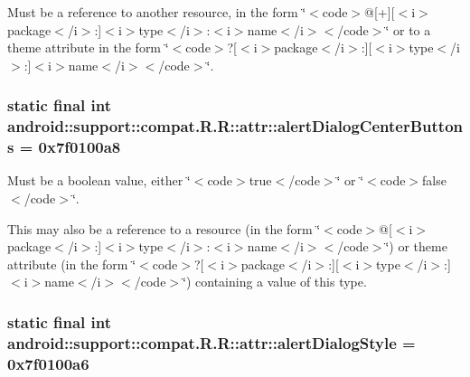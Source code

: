 Must be a reference to another resource, in the form \char`\"{}$<$code$>$@\mbox{[}+\mbox{]}\mbox{[}$<$i$>$package$<$/i$>$:\mbox{]}$<$i$>$type$<$/i$>$:$<$i$>$name$<$/i$>$$<$/code$>$\char`\"{} or to a theme attribute in the form \char`\"{}$<$code$>$?\mbox{[}$<$i$>$package$<$/i$>$:\mbox{]}\mbox{[}$<$i$>$type$<$/i$>$:\mbox{]}$<$i$>$name$<$/i$>$$<$/code$>$\char`\"{}. \hypertarget{classandroid_1_1support_1_1compat_1_1_r_1_1attr_4100dbaeb2699eb6a05f4d338dc8fa5c}{
\subsubsection[{alertDialogCenterButtons}]{\setlength{\rightskip}{0pt plus 5cm}static final int android::support::compat.R.R::attr::alertDialogCenterButtons = 0x7f0100a8}}
\label{classandroid_1_1support_1_1compat_1_1_r_1_1attr_4100dbaeb2699eb6a05f4d338dc8fa5c}


Must be a boolean value, either \char`\"{}$<$code$>$true$<$/code$>$\char`\"{} or \char`\"{}$<$code$>$false$<$/code$>$\char`\"{}. 

This may also be a reference to a resource (in the form \char`\"{}$<$code$>$@\mbox{[}$<$i$>$package$<$/i$>$:\mbox{]}$<$i$>$type$<$/i$>$:$<$i$>$name$<$/i$>$$<$/code$>$\char`\"{}) or theme attribute (in the form \char`\"{}$<$code$>$?\mbox{[}$<$i$>$package$<$/i$>$:\mbox{]}\mbox{[}$<$i$>$type$<$/i$>$:\mbox{]}$<$i$>$name$<$/i$>$$<$/code$>$\char`\"{}) containing a value of this type. \hypertarget{classandroid_1_1support_1_1compat_1_1_r_1_1attr_bd023effa5d9a07c8e8ddd9b5737c8ca}{
\subsubsection[{alertDialogStyle}]{\setlength{\rightskip}{0pt plus 5cm}static final int android::support::compat.R.R::attr::alertDialogStyle = 0x7f0100a6}}
\label{classandroid_1_1support_1_1compat_1_1_r_1_1attr_bd023effa5d9a07c8e8ddd9b5737c8ca}


